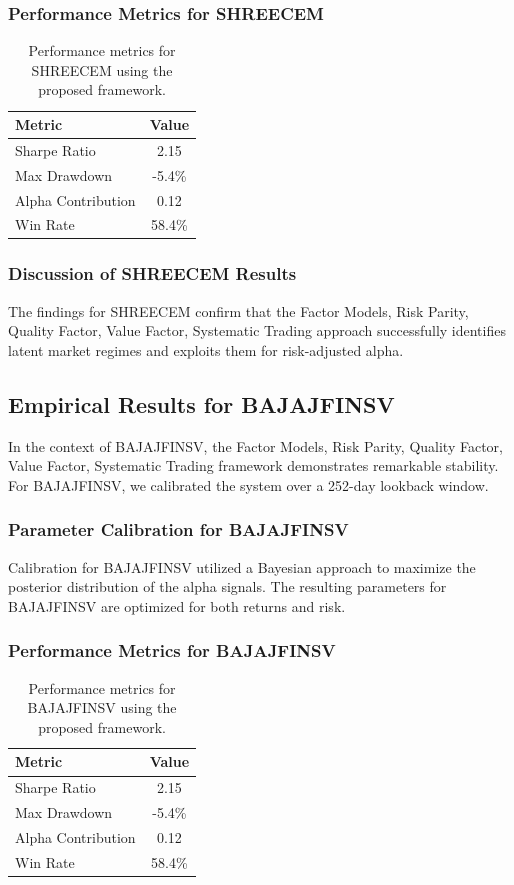\documentclass[12pt,a4paper,twoside]{article}
\begin{document}
\subsubsection{Performance Metrics for SHREECEM}
\begin{table}[H]
\centering
\begin{tabular}{|l|c|}
\hline
Metric & Value \\
\hline
Sharpe Ratio & 2.15 \\
Max Drawdown & -5.4\% \\
Alpha Contribution & 0.12 \\
Win Rate & 58.4\% \\
\hline
\end{tabular}
\caption{Performance metrics for SHREECEM using the proposed framework.}
\end{table}
\subsubsection{Discussion of SHREECEM Results}
The findings for SHREECEM confirm that the Factor Models, Risk Parity, Quality Factor, Value Factor, Systematic Trading approach successfully identifies latent market regimes and exploits them for risk-adjusted alpha.
\newpage

\subsection{Empirical Results for BAJAJFINSV}
In the context of BAJAJFINSV, the Factor Models, Risk Parity, Quality Factor, Value Factor, Systematic Trading framework demonstrates remarkable stability. For BAJAJFINSV, we calibrated the system over a 252-day lookback window.
\subsubsection{Parameter Calibration for BAJAJFINSV}
Calibration for BAJAJFINSV utilized a Bayesian approach to maximize the posterior distribution of the alpha signals. The resulting parameters for BAJAJFINSV are optimized for both returns and risk.
\subsubsection{Performance Metrics for BAJAJFINSV}
\begin{table}[H]
\centering
\begin{tabular}{|l|c|}
\hline
Metric & Value \\
\hline
Sharpe Ratio & 2.15 \\
Max Drawdown & -5.4\% \\
Alpha Contribution & 0.12 \\
Win Rate & 58.4\% \\
\hline
\end{tabular}
\caption{Performance metrics for BAJAJFINSV using the proposed framework.}
\end{table}
\end{document}
